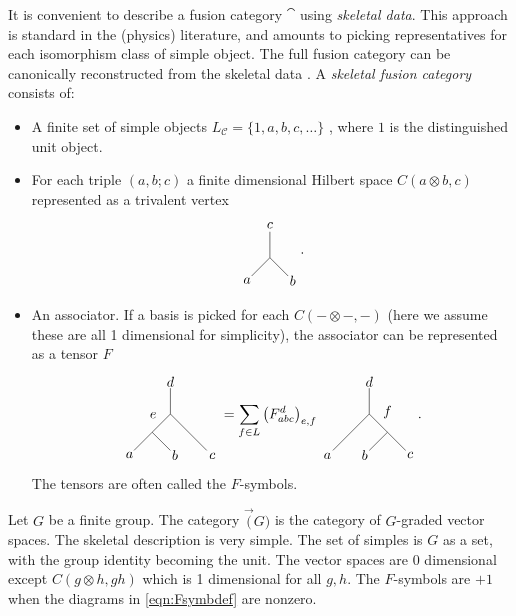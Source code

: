 \begin{definition}
	It is convenient to describe a fusion category $\cat$ using \emph{skeletal data}. This approach is standard in the (physics) literature, and amounts to picking representatives for each isomorphism class of simple object. The full fusion category can be canonically reconstructed from the skeletal data \cite{BBJSkeletal}. A \emph{skeletal fusion category} consists of:
	\begin{itemize}
		\item A finite set of simple objects $L_\mathcal{C}=\{1,a,b,c,\ldots\}$ , where $1$ is the distinguished unit object.
		\item For each triple $(a,b;c)$ a finite dimensional Hilbert space $C(a\otimes b,c)$ represented as a trivalent vertex
		\begin{equation}
		\begin{tikzpicture}[scale=0.65,baseline=(current bounding box.center)]
		\draw (-.707,-.707)--(0,0) node[pos=-.25] {$a$};
		\draw (.707,-.707)--(0,0) node[pos=-.25] {$b$};
		\draw (0,0)--(0,1) node[pos=1.25] {$c$};
		\end{tikzpicture}.
		\end{equation} 
		\item An associator. If a basis is picked for each $C(-\otimes -,-)$ (here we assume these are all 1 dimensional for simplicity), the associator can be represented as a tensor $F$
		\begin{equation}
		\begin{tikzpicture}[scale=0.65,baseline=(current bounding box.center)]
		\draw (0,0)--(0,1) node[pos=1.25] {$d$};
		\draw (0,0)--(1.41,-1.41) node[pos=1.15] {$c$};
		\draw (0,0)--(-.707,-.707) node [pos=.5,above left] {$e$};
		\draw (-.707,-.707)--(-1.41,-1.41)node[pos=1.25] {$a$};
		\draw (-.707,-.707)--(0,-1.41)node[pos=1.25] {$b$};
		\end{tikzpicture}
		=\sum_{f\in L}\left(F_{abc}^{d}\right)_{e,f}
		\begin{tikzpicture}[scale=0.65,baseline=(current bounding box.center)]
		\draw (0,0)--(0,1) node[pos=1.25] {$d$};
		\draw (.707,-.707)--(1.41,-1.41) node[pos=1.25] {$c$};
		\draw (0,0)--(.707,-.707) node [pos=.5,above right] {$f$};
		\draw (0,0)--(-1.41,-1.41)node[pos=1.15] {$a$};
		\draw (.707,-.707)--(0,-1.41)node[pos=1.25] {$b$};
		\end{tikzpicture}.\label{eqn:Fsymbdef}
		\end{equation} 
		The tensors are often called the $F$-symbols.
	\end{itemize}
\end{definition}

\begin{example}[$\Vec(G)$]\label{example:vecG}
	Let $G$ be a finite group. The category $\Vec(G)$ is the category of $G$-graded vector spaces. The skeletal description is very simple. The set of simples is $G$ as a set, with the group identity becoming the unit. The vector spaces are 0 dimensional except $C(g\otimes h, gh)$ which is 1 dimensional for all $g,h$. The $F$-symbols are $+1$ when the diagrams in \eqref{eqn:Fsymbdef} are nonzero.
\end{example}